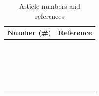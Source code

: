 \begin{table}[ht]
  \centering
  \caption{ Article numbers and references }
  \label{table:relrefs}
  \begin{tabular}{|| c c ||} 
    \hline
    Number (\#) & Reference \\ [0.5ex] 
    \hline\hline
    [1] & \cite{rel1} \\ 
    \hline
    [2] & \cite{rel2} \\ 
    \hline
    [3] & \cite{rel3} \\ 
    \hline
    [4] & \cite{rel4} \\ 
    \hline
    [5] & \cite{rel5} \\ 
    \hline
    [6] & \cite{rel6} \\ 
    \hline
    [7] & \cite{rel7} \\ 
    \hline
    [8] & \cite{rel8} \\ 
    \hline
    [9] & \cite{rel9} \\ 
    \hline
    [10] & \cite{rel10} \\ 
    \hline
    [11] & \cite{rel11} \\ 
    \hline
    [12] & \cite{rel12} \\ 
    \hline
    [13] & \cite{rel13} \\ 
    \hline
    [14] & \cite{rel14} \\ 
    \hline
    [15] & \cite{rel15} \\ 
    \hline
    [16] & \cite{rel16} \\ 
    \hline
    [17] & \cite{rel17} \\ 
    \hline
    [18] & \cite{rel18} \\ 
    \hline
    [19] & \cite{rel19} \\ 
    \hline
    [20] & \cite{rel20} \\ 
    \hline
  \end{tabular}
\end{table}

\newcommand{\V}{ \checkmark }
\newcommand{\X}{ \text{\sffamily X} }

